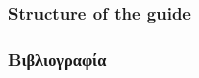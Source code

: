 \documentclass[aspectratio=169,draft]{Classes/beamerLct}%
\begin{document}
\maketitle

\begin{frame}
  \frametitle{Structure of the guide}
  \tableofcontents
\end{frame}








% 
% 


\makeqahour


\ifdefinePrintbib
  \begin{frame}[t,allowframebreaks]
    \frametitle{Βιβλιογραφία}
    \printbibliography
  \end{frame}
\fi

% 


\end{document}
